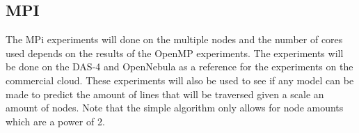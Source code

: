 \subsection{MPI}
The MPi experiments will done on the multiple nodes and the number of cores used depends on the results of the OpenMP experiments. The experiments will be done on the DAS-4 and OpenNebula as a reference for the experiments on the commercial cloud. These experiments will also be used to see if any model can be made to predict the amount of lines that will be traversed given a scale an amount of nodes. Note that the simple algorithm only allows for node amounts which are a power of 2.

    

    

    

    

    

    

    

   

     
